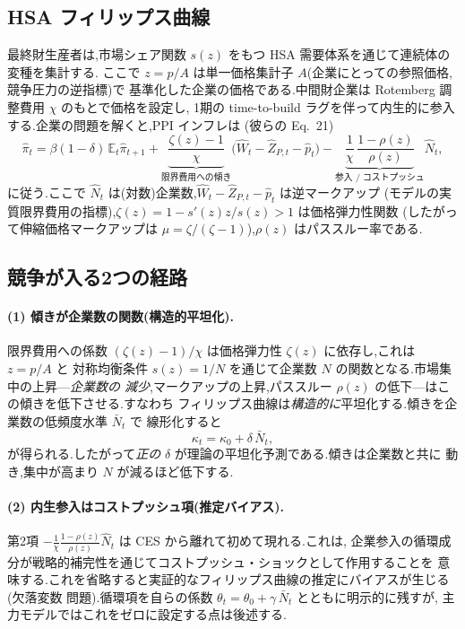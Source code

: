\documentclass[11pt]{article}
\newcommand{\kt}{\kappa_t}
\begin{document}
\subsection{HSA フィリップス曲線}
最終財生産者は,市場シェア関数 $s(z)$ をもつ HSA 需要体系を通じて連続体の変種を集計する.
ここで $z=p/A$ は単一価格集計子 $A$(企業にとっての参照価格,競争圧力の逆指標)で
基準化した企業の価格である.中間財企業は Rotemberg 調整費用 $\chi$ のもとで価格を設定し,
1期の time-to-build ラグを伴って内生的に参入する.企業の問題を解くと,PPI インフレは
(彼らの Eq.~21)
\begin{equation}
\hat\pi_t=\beta(1-\delta)\,\mathbb E_t\hat\pi_{t+1}
+\underbrace{\frac{\zeta(z)-1}{\chi}}_{\text{限界費用への傾き}}
\big(\hat W_t-\hat Z_{P,t}-\hat p_t\big)
-\underbrace{\frac{1}{\chi}\,\frac{1-\rho(z)}{\rho(z)}}_{\text{参入 / コストプッシュ}}\hat N_t,
\label{eq:fm}
\end{equation}
に従う.ここで $\hat N_t$ は(対数)企業数,$\hat W_t-\hat Z_{P,t}-\hat p_t$ は逆マークアップ
(モデルの実質限界費用の指標),$\zeta(z)=1-s'(z)z/s(z)>1$ は価格弾力性関数
(したがって伸縮価格マークアップは $\mu=\zeta/(\zeta-1)$),$\rho(z)$ はパススルー率である.

\subsection{競争が入る2つの経路}
\paragraph{(1) 傾きが企業数の関数(構造的平坦化).}
限界費用への係数 $(\zeta(z)-1)/\chi$ は価格弾力性 $\zeta(z)$ に依存し,これは $z=p/A$ と
対称均衡条件 $s(z)=1/N$ を通じて企業数 $N$ の関数となる.市場集中の上昇---\emph{企業数の
減少},マークアップの上昇,パススルー $\rho(z)$ の低下---はこの傾きを低下させる.すなわち
フィリップス曲線は\emph{構造的に}平坦化する.傾きを企業数の低頻度水準 $\bar N_t$ で
線形化すると
\begin{equation}
\kt=\kappa_0+\delta\,\bar N_t,
\end{equation}
が得られる.したがって\emph{正の} $\delta$ が理論の平坦化予測である.傾きは企業数と共に
動き,集中が高まり $N$ が減るほど低下する.

\paragraph{(2) 内生参入はコストプッシュ項(推定バイアス).} 第2項
$-\tfrac{1}{\chi}\tfrac{1-\rho(z)}{\rho(z)}\hat N_t$ は CES から離れて初めて現れる.これは,
企業参入の循環成分が戦略的補完性を通じてコストプッシュ・ショックとして作用することを
意味する.これを省略すると実証的なフィリップス曲線の推定にバイアスが生じる(欠落変数
問題).循環項を自らの係数 $\theta_t=\theta_0+\gamma\,\bar N_t$ とともに明示的に残すが,
主力モデルではこれをゼロに設定する点は後述する.
\end{document}
